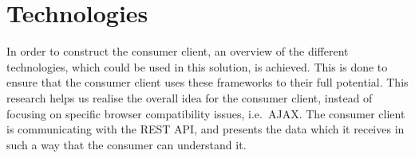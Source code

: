 \section{Technologies} \label{sec:technologies}
In order to construct the consumer client, an overview of the different technologies, which could be used in this solution, is achieved.
This is done to ensure that the consumer client uses these frameworks to their full potential.
This research helps us realise the overall idea for the consumer client, instead of focusing on specific browser compatibility issues, i.e.~\ac{AJAX}.
The consumer client is communicating with the REST API, and presents the data which it receives in such a way that the consumer can understand it.
